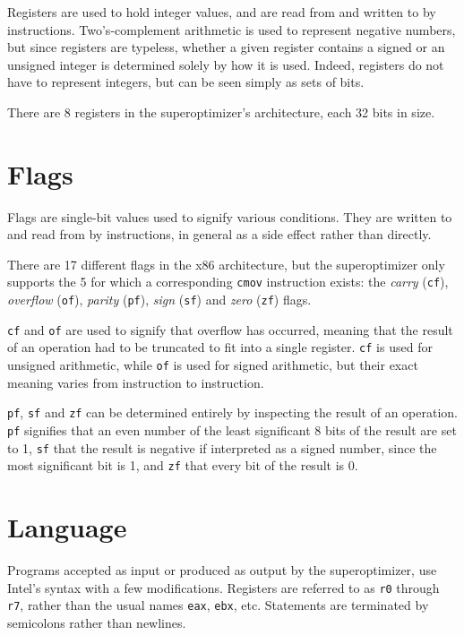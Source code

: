 \documentclass[a4paper,11pt]{kth-mag}
\begin{document}
Registers are used to hold integer values, and are read from and written to by instructions.
Two's-complement arithmetic is used to represent negative numbers, but since registers are typeless, whether a given register contains a signed or an unsigned integer is determined solely by how it is used.
Indeed, registers do not have to represent integers, but can be seen simply as sets of bits.

There are 8 registers in the superoptimizer's architecture, each 32 bits in size.

\section{Flags}
\label{s:flags}

Flags are single-bit values used to signify various conditions.
They are written to and read from by instructions, in general as a side effect rather than directly.

There are 17 different flags in the x86 architecture, but the superoptimizer only supports the 5 for which a corresponding \verb|cmov| instruction exists:
the \emph{carry} (\verb|cf|), \emph{overflow} (\verb|of|), \emph{parity} (\verb|pf|), \emph{sign} (\verb|sf|) and \emph{zero} (\verb|zf|) flags.

\verb|cf| and \verb|of| are used to signify that overflow has occurred, meaning that the result of an operation had to be truncated to fit into a single register.
\verb|cf| is used for unsigned arithmetic, while \verb|of| is used for signed arithmetic, but their exact meaning varies from instruction to instruction.

\verb|pf|, \verb|sf| and \verb|zf| can be determined entirely by inspecting the result of an operation.
\verb|pf| signifies that an even number of the least significant 8 bits of the result are set to 1,
\verb|sf| that the result is negative if interpreted as a signed number, since the most significant bit is 1,
and \verb|zf| that every bit of the result is 0.

\section{Language}
\label{s:language}

Programs accepted as input or produced as output by the superoptimizer, use Intel's syntax with a few modifications.
Registers are referred to as \verb|r0| through \verb|r7|, rather than the usual names \verb|eax|, \verb|ebx|, etc.
Statements are terminated by semicolons rather than newlines.
\end{document}
